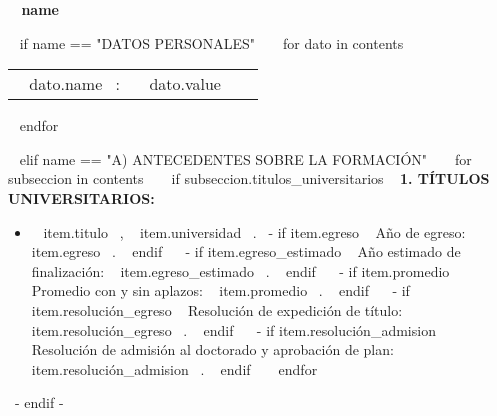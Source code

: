 \medskip

\selectfont

\hspace{-20mm}\colorbox{maincolor}{\begin{minipage}[t][8mm][c]{150mm}
\hspace{12mm}\bfseries \color{white}  ~{{ name }}~
\end{minipage}}
\vspace{6mm}


~{ if name == "DATOS PERSONALES" }~
  ~{ for dato in contents }~
    \begin{tabular}{ @{} p{38mm} p{90mm} l @{}}
      {\small ~{{ dato.name }}~}: & {\small ~{{ dato.value }}~}
    \end{tabular}
    \vspace{1mm}
  ~{ endfor }~
  \vspace{2mm}

~{ elif name == "A) ANTECEDENTES SOBRE LA FORMACIÓN" }~
  ~{ for subseccion in contents }~
    ~{ if subseccion.titulos_universitarios }~
      \textbf{1. TÍTULOS UNIVERSITARIOS:}
      \begin{itemize}
      ~{ for item in subseccion.titulos_universitarios }~
        \item ~{{ item.titulo }}~, ~{{ item.universidad }}~.
              ~{- if item.egreso }~ Año de egreso: ~{{ item.egreso }}~. ~{ endif }~
              ~{- if item.egreso_estimado }~ Año estimado de finalización: ~{{ item.egreso_estimado }}~. ~{ endif }~
              ~{- if item.promedio }~ Promedio con y sin aplazos: ~{{ item.promedio }}~. ~{ endif }~
              ~{- if item.resolución_egreso }~ Resolución de expedición de título: ~{{ item.resolución_egreso }}~. ~{ endif }~
              ~{- if item.resolución_admision }~ Resolución de admisión al doctorado y aprobación de plan: ~{{ item.resolución_admision }}~. ~{ endif }~
      ~{ endfor }~
      \end{itemize}
      \vspace{1mm}
    ~{- endif -}~

